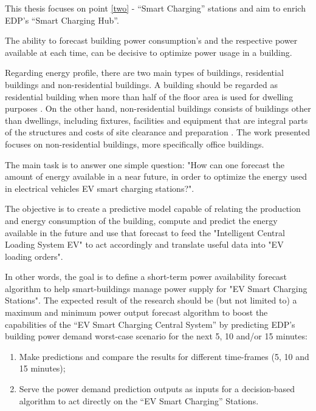 This thesis focuses on point \ref{two} - “Smart Charging” stations and aim to enrich \ac{EDP}’s “Smart Charging Hub”. 

The ability to forecast building power consumption's and the respective power available at each time, can be decisive to optimize power usage in a building.  


Regarding energy profile, there are two main types of buildings, residential buildings and non-residential buildings. A building should be regarded as residential building when more than half of the floor area is used for dwelling purposes \cite{OECD}. On the other hand, non-residential buildings consists of buildings other than dwellings, including fixtures, facilities and equipment that are integral parts of the structures and costs of site clearance and preparation \cite{OECD}. The work presented focuses on non-residential buildings, more specifically office buildings.

 




The main task is to answer one simple question: "How can one forecast the amount of energy available in a near future, in order to optimize the energy used in electrical vehicles \ac{EV} smart charging stations?".


The objective is to create a predictive model capable of relating the production and energy consumption of the building, compute and predict the energy available in the future and use that forecast to feed the "Intelligent Central Loading System \ac{EV}" to act accordingly and translate useful data into "\ac{EV} loading orders". 


In other words, the goal is to define a short-term power availability forecast algorithm to help smart-buildings manage power supply for "\ac{EV} Smart Charging Stations".
The expected result of the research should be (but not limited to) a maximum and minimum power output forecast algorithm to boost the capabilities of the “\ac{EV} Smart Charging Central System” by predicting \ac{EDP}'s building power demand worst-case scenario for the next 5, 10 and/or 15 minutes:
\begin{enumerate}[noitemsep,topsep=0pt]
  \itemsep0em 
  \item Make predictions and compare the results for different time-frames (5, 10 and 15 minutes);
  \item Serve the power demand prediction outputs as inputs for a decision-based algorithm to act directly on the “\ac{EV} Smart Charging” Stations.
\end{enumerate}   
  
